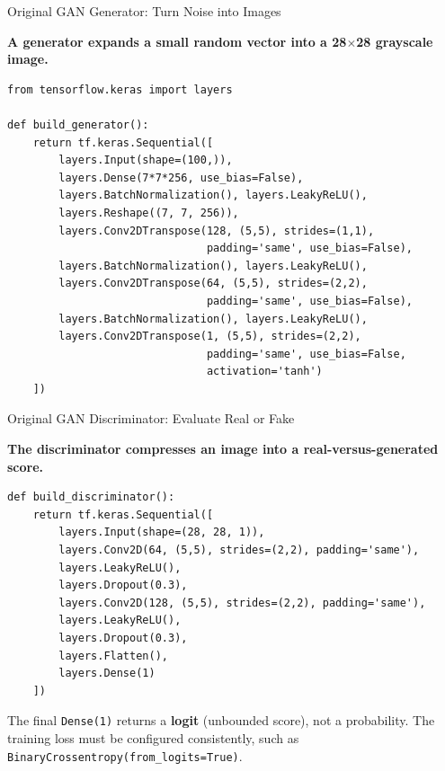 \documentclass[aspectratio=169,10pt]{beamer}
\newcommand{\conceptlead}[1]{{\small\bfseries\color{CalPolyGreen}#1\par}}
\begin{document}
\begin{frame}[fragile]{Original GAN Generator: Turn Noise into Images}
\scriptsize
\conceptlead{A generator expands a small random vector into a 28$\times$28 grayscale image.}
\begin{verbatim}
from tensorflow.keras import layers

def build_generator():
    return tf.keras.Sequential([
        layers.Input(shape=(100,)),
        layers.Dense(7*7*256, use_bias=False),
        layers.BatchNormalization(), layers.LeakyReLU(),
        layers.Reshape((7, 7, 256)),
        layers.Conv2DTranspose(128, (5,5), strides=(1,1),
                               padding='same', use_bias=False),
        layers.BatchNormalization(), layers.LeakyReLU(),
        layers.Conv2DTranspose(64, (5,5), strides=(2,2),
                               padding='same', use_bias=False),
        layers.BatchNormalization(), layers.LeakyReLU(),
        layers.Conv2DTranspose(1, (5,5), strides=(2,2),
                               padding='same', use_bias=False,
                               activation='tanh')
    ])
\end{verbatim}
\end{frame}

\begin{frame}[fragile]{Original GAN Discriminator: Evaluate Real or Fake}
\small
\conceptlead{The discriminator compresses an image into a real-versus-generated score.}
{\footnotesize\begin{verbatim}
def build_discriminator():
    return tf.keras.Sequential([
        layers.Input(shape=(28, 28, 1)),
        layers.Conv2D(64, (5,5), strides=(2,2), padding='same'),
        layers.LeakyReLU(),
        layers.Dropout(0.3),
        layers.Conv2D(128, (5,5), strides=(2,2), padding='same'),
        layers.LeakyReLU(),
        layers.Dropout(0.3),
        layers.Flatten(),
        layers.Dense(1)
    ])
\end{verbatim}}
\begin{keyidea}The final \texttt{Dense(1)} returns a \textbf{logit} (unbounded score), not a probability. The training loss must be configured consistently, such as \texttt{BinaryCrossentropy(from\_logits=True)}.\end{keyidea}
\end{frame}
\end{document}

